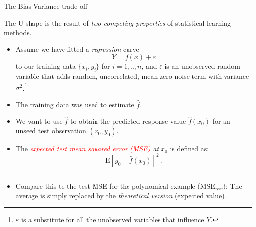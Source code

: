 \documentclass[ignorenonframetext,]{beamer}
\providecommand{\tightlist}{%
  \setlength{\itemsep}{0pt}\setlength{\parskip}{0pt}}
\begin{document}
\begin{frame}{The Bias-Variance trade-off}
\protect\hypertarget{the-bias-variance-trade-off}{}

\vspace{2mm}

The U-shape is the result of \emph{two competing properties} of
statistical learning methods.

\vspace{2mm}

\begin{itemize}
\tightlist
\item
  Assume we have fitted a \emph{regression} curve
  \[Y  = f(x) + \varepsilon\] to our training data \(\{x_i, y_i\}\) for
  \(i=1,..,n\), and \(\varepsilon\) is an unobserved random variable
  that adds random, uncorrelated, mean-zero noise term with variance
  \(\sigma^2\).\footnote{$\varepsilon$ is a substitute for all the unobserved variables that influence $Y$.}
\end{itemize}

\vspace{2mm}

\begin{itemize}
\tightlist
\item
  The training data was used to estimate \(\hat{f}\).
\end{itemize}

\end{frame}

\begin{frame}

\begin{itemize}
\item
  We want to use \(\hat{f}\) to obtain the predicted response value
  \(\hat{f}(x_0)\) for an unseed test observation \((x_0,y_0)\).
\item
  The \emph{\textcolor{red}{expected test mean squared error (MSE)} at
  \(x_0\)} is defined as: \[\text{E}[y_0 - \hat{f}(x_0)]^2 \ .\]
\end{itemize}

\(~\)

\begin{itemize}
\tightlist
\item
  Compare this to the test MSE for the polynomical example
  (\(\text{MSE}_{\text{test}}\)): The average is simply replaced by the
  \emph{theoretical version} (expected value).
\end{itemize}

\end{frame}
\end{document}
